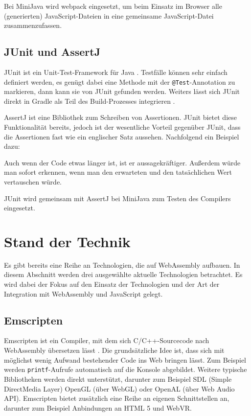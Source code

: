 Bei MiniJava wird webpack eingesetzt, um beim Einsatz im Browser alle (generierten) JavaScript-Dateien in eine gemeinsame JavaScript-Datei zusammenzufassen.

\subsection{JUnit und AssertJ}
JUnit ist ein Unit-Test-Framework für Java \cite{JUnit}. Testfälle können sehr einfach definiert werden, es genügt dabei eine Methode mit der \lstinline{@Test}-Annotation zu markieren, dann kann sie von JUnit gefunden werden. Weiters lässt sich JUnit direkt in Gradle als Teil des Build-Prozesses integrieren \cite{Gradle}.

AssertJ ist eine Bibliothek zum Schreiben von Assertionen. JUnit bietet diese Funktionalität bereits, jedoch ist der wesentliche Vorteil gegenüber JUnit, dass die Assertionen fast wie ein englischer Satz aussehen. Nachfolgend ein Beispiel dazu:



Auch wenn der Code etwas länger ist, ist er aussagekräftiger. Außerdem würde man sofort erkennen, wenn man den erwarteten und den tatsächlichen Wert vertauschen würde.

JUnit wird gemeinsam mit AssertJ bei MiniJava zum Testen des Compilers eingesetzt.

\section{Stand der Technik}
Es gibt bereits eine Reihe an Technologien, die auf WebAssembly aufbauen. In diesem Abschnitt werden drei ausgewählte aktuelle Technologien betrachtet. Es wird dabei der Fokus auf den Einsatz der Technologien und der Art der Integration mit WebAssembly und JavaScript gelegt.

\subsection{Emscripten}

Emscripten ist ein Compiler, mit dem sich C/C++-Sourcecode nach WebAssembly übersetzen lässt \cite{Emscripten}. Die grundsätzliche Idee ist, dass sich mit möglichst wenig Aufwand bestehender Code ins Web bringen lässt. Zum Beispiel werden \lstinline{printf}-Aufrufe automatisch auf die Konsole abgebildet. Weitere typische Bibliotheken werden direkt unterstützt, darunter zum Beispiel SDL (Simple DirectMedia Layer) OpenGL (über WebGL) oder OpenAL (über Web Audio API). Emscripten bietet zusätzlich eine Reihe an eigenen Schnittstellen an, darunter zum Beispiel Anbindungen an HTML 5 und WebVR.

